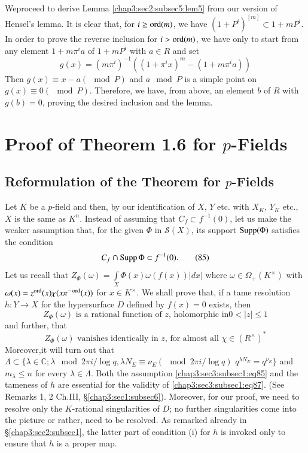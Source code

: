 We\pageoriginale proceed to derive Lemma \ref{chap3:sec2:subsec5:lem5}
from our version 
of Hensel's \break lemma. It is clear that, for $i\geq \operatorname{ord}(m)$, we have
$(1+P^{i})^{[m]}\subset 1+mP^{i}$. In order to prove the reverse
inclusion for $i>\operatorname{ord}(m)$, we have only to start from any element
$1+m\pi^{i}a$ of $1+mP^{i}$ with $a\in R$ and set
$$
g(x)=(m\pi^{i})^{-1}((1+\pi^{i}x)^{m}-(1+m\pi^{i}a))
$$
Then $g(x)\equiv x-a(\mod P)$ and $a \mod P$ is a simple point on
$g(x)\equiv 0(\mod P)$. Therefore, we have, from above, an element $b$
of $R$ with $g(b)=0$, proving the desired inclusion and the lemma.

\section{Proof of Theorem 1.6 for $p$-Fields}\label{chap3:sec3} %

\subsection{Reformulation of the Theorem for
  $p$-Fields}\label{chap3:sec3:subsec1} %

Let $K$ be a $p$-field and then, by our identification of $X$, $Y$
etc. with $X_{K}$, $Y_{K}$ etc., $X$ is the same as $K^{n}$. Instead
of assuming that $C_{f}\subset f^{-1}(0)$, let us make the weaker
assumption that, for the given $\Phi$ in $\mathscr{S}(X)$, its support
$\operatorname{Supp}(\Phi)$ satisfies the condition
\begin{equation*}
C_{f}\cap \operatorname{Supp}\Phi\subset f^{-1}(0).\tag{85}\label{chap3:sec3:subsec1:eq85}
\end{equation*}
Let us recall that
$Z_{\Phi}(\omega)=\int\limits_{X}\Phi(x)\omega(f(x))|dx|$ where
$\omega\in \Omega_{+}(K^{\times})$ with
$\omega(x)=z^{\operatorname{ord}}(x)\chi(x\pi^{-\operatorname{ord}}(x))$ for $x\in K^{\times}$. We
shall prove that, if a tame resolution $h:Y\to X$ for the hypersurface
$D$ defined by $f(x)=0$ exists, then
\begin{equation*}
Z_{\Phi}(\omega) \text{ is a rational function of $z$, holomorphic in
} 0<|z|\leq 1\tag{86} \label{chap3:sec3:subsec1:eq86}
\end{equation*}
and further, that
\begin{equation*}
Z_{\Phi}(\omega) \text{ vanishes identically in $z$, for almost all }
\chi\in (R^{\times})^{\ast}\tag{87}\label{chap3:sec3:subsec1:eq87}
\end{equation*}
Moreover,\pageoriginale it will turn out that $\Lambda\subset
\{\lambda\in\mathbb{C};\lambda\mod 2\pi i/\log q, \lambda N_{E}\equiv
\nu_{E}(\mod 2\pi i/\log q)$ \ie $q^{\lambda N_{E}}=q^{\nu_{E}}\}$ and
$m_\lambda\leq n$ for every $\lambda\in \Lambda$. Both the assumption
  \ref{chap3:sec3:subsec1:eq85} and the tameness of $h$ are essential
  for the validity of 
  \ref{chap3:sec3:subsec1:eq87}. (See Remarks 1, 2 Ch.III,
  \S \ref{chap3:sec1:subsec6}). Moreover, for
  our proof, we need to resolve only the $K$-rational singularities of
  $D$; no further singularities come into the picture or rather, need
  to be resolved. As remarked already in \S \ref{chap3:sec2:subsec1}, the latter
  part of condition (i) for $h$ is invoked only to ensure that $h$ is
  a proper map.

